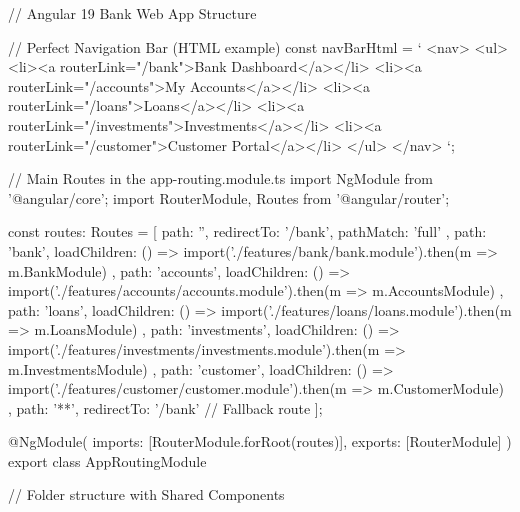 // Angular 19 Bank Web App Structure

// Perfect Navigation Bar (HTML example)
const navBarHtml = `
<nav>
  <ul>
    <li><a routerLink="/bank">Bank Dashboard</a></li>
    <li><a routerLink="/accounts">My Accounts</a></li>
    <li><a routerLink="/loans">Loans</a></li>
    <li><a routerLink="/investments">Investments</a></li>
    <li><a routerLink="/customer">Customer Portal</a></li>
  </ul>
</nav>
`;

// Main Routes in the app-routing.module.ts
import { NgModule } from '@angular/core';
import { RouterModule, Routes } from '@angular/router';

const routes: Routes = [
    { path: '', redirectTo: '/bank', pathMatch: 'full' },
    { path: 'bank', loadChildren: () => import('./features/bank/bank.module').then(m => m.BankModule) },
    { path: 'accounts', loadChildren: () => import('./features/accounts/accounts.module').then(m => m.AccountsModule) },
    { path: 'loans', loadChildren: () => import('./features/loans/loans.module').then(m => m.LoansModule) },
    { path: 'investments', loadChildren: () => import('./features/investments/investments.module').then(m => m.InvestmentsModule) },
    { path: 'customer', loadChildren: () => import('./features/customer/customer.module').then(m => m.CustomerModule) },
    { path: '**', redirectTo: '/bank' } // Fallback route
];

@NgModule({
    imports: [RouterModule.forRoot(routes)],
    exports: [RouterModule]
})
export class AppRoutingModule { }

// Folder structure with Shared Components

